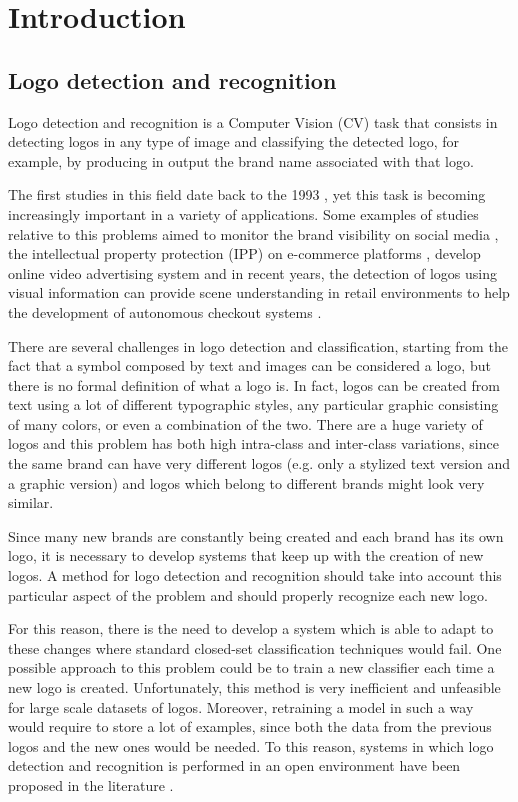 \chapter{Introduction}
\label{chap:introduction}

\section{Logo detection and recognition}
\label{sec:logodet-intro}

Logo detection and recognition is a Computer Vision (CV) task that consists in detecting logos in any type of image and classifying the detected logo, for example, by producing in output the brand name associated with that logo. 

The first studies in this field date back to the 1993 \cite{doermann1993logo}, yet this task is becoming increasingly important in a variety of applications. Some examples of studies relative to this problems aimed to monitor the brand visibility on social media \cite{7492197}, the intellectual property protection (IPP) on e-commerce platforms \cite{jin2020open}, develop online video advertising system \cite{cheng2017video} and in recent years, the detection of logos using visual information can provide scene understanding in retail environments to help the development of autonomous checkout systems \cite{mata2022standardsim}.

There are several challenges in logo detection and classification, starting from the fact that a symbol composed by text and images can be considered a logo, but there is no formal definition of what a logo is. In fact, logos can be created from text using a lot of different typographic styles, any particular graphic consisting of many colors, or even a combination of the two.
There are a huge variety of logos and this problem has both high intra-class and inter-class variations, since the same brand can have very different logos (e.g. only a stylized text version and a graphic version) and logos which belong to different brands might look very similar.

Since many new brands are constantly being created and each brand has its own logo, it is necessary to develop systems that keep up with the creation of new logos. A method for logo detection and recognition should take into account this particular aspect of the problem and should properly recognize each new logo.

For this reason, there is the need to develop a system which is able to adapt to these changes where standard closed-set classification techniques would fail. One possible approach to this problem could be to train a new classifier each time a new logo is created. Unfortunately, this method is very inefficient and unfeasible for large scale datasets of logos. Moreover, retraining a model in such a way would require to store a lot of examples, since both the data from the previous logos and the new ones would be needed. To this reason, systems in which logo detection and recognition is performed in an open environment have been proposed in the literature \cite{fehervari2019scalable,li2022seetek}.

